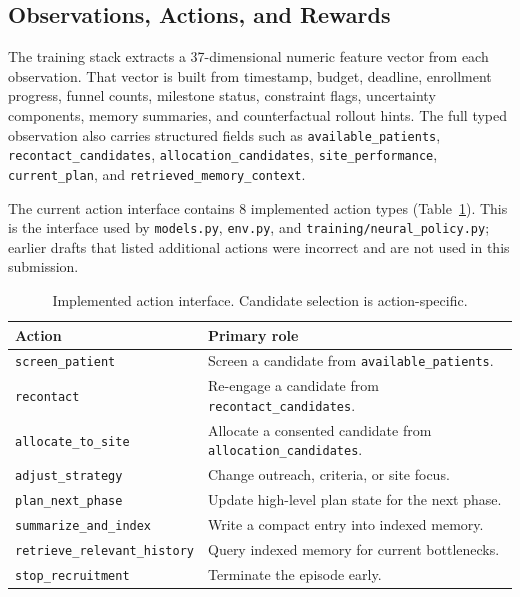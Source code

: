 \documentclass{article}
\begin{document}
\subsection{Observations, Actions, and Rewards}

The training stack extracts a 37-dimensional numeric feature vector from each observation. That vector is built from timestamp, budget, deadline, enrollment progress, funnel counts, milestone status, constraint flags, uncertainty components, memory summaries, and counterfactual rollout hints. The full typed observation also carries structured fields such as \texttt{available\_patients}, \texttt{recontact\_candidates}, \texttt{allocation\_candidates}, \texttt{site\_performance}, \texttt{current\_plan}, and \texttt{retrieved\_memory\_context}.

The current action interface contains 8 implemented action types (Table~\ref{tab:actions}). This is the interface used by \texttt{models.py}, \texttt{env.py}, and \texttt{training/neural\_policy.py}; earlier drafts that listed additional actions were incorrect and are not used in this submission.

\begin{table}[t]
  \centering
  \caption{Implemented action interface. Candidate selection is action-specific.}
  \label{tab:actions}
  \small
  \begin{tabularx}{\linewidth}{lX}
    \toprule
    Action & Primary role \\
    \midrule
    \texttt{screen\_patient} & Screen a candidate from \texttt{available\_patients}. \\
    \texttt{recontact} & Re-engage a candidate from \texttt{recontact\_candidates}. \\
    \texttt{allocate\_to\_site} & Allocate a consented candidate from \texttt{allocation\_candidates}. \\
    \texttt{adjust\_strategy} & Change outreach, criteria, or site focus. \\
    \texttt{plan\_next\_phase} & Update high-level plan state for the next phase. \\
    \texttt{summarize\_and\_index} & Write a compact entry into indexed memory. \\
    \texttt{retrieve\_relevant\_history} & Query indexed memory for current bottlenecks. \\
    \texttt{stop\_recruitment} & Terminate the episode early. \\
    \bottomrule
  \end{tabularx}
\end{table}
\end{document}
